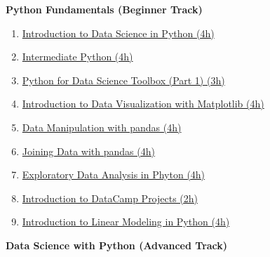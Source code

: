 \documentclass[
  11pt,
]{article}
\providecommand{\tightlist}{%
  \setlength{\itemsep}{0pt}\setlength{\parskip}{0pt}}
\newenvironment{tipsp}[1]
  {
  \begin{itemize}
  \footnotesize
  \renewcommand{\labelitemi}{
    \raisebox{-.7\height}[0pt][0pt]{
      {\setkeys{Gin}{width=3em,keepaspectratio}
        \texttt{[image: images/\#1.png]}}
    }
  }
  \setlength{\fboxsep}{1em}
  \begin{pbox}
  \item
  }
  {
  \end{pbox}
  \end{itemize}
  }
\begin{document}
\begin{tipsp}p

\textbf{Python Fundamentals (Beginner Track)}

\begin{enumerate}
\def\labelenumi{\arabic{enumi}.}
\tightlist
\item
  \href{https://www.datacamp.com/courses/introduction-to-data-science-in-python}{Introduction to Data Science in Python (4h)}
\item
  \href{https://www.datacamp.com/courses/intermediate-python-for-data-science}{Intermediate Python (4h)}
\item
  \href{https://www.datacamp.com/courses/python-data-science-toolbox-part-1}{Python for Data Science Toolbox (Part 1) (3h)}
\item
  \href{https://www.datacamp.com/courses/introduction-to-matplotlib}{Introduction to Data Visualization with Matplotlib (4h)}
\item
  \href{https://www.datacamp.com/courses/data-manipulation-with-pandas}{Data Manipulation with pandas (4h)}
\item
  \href{https://www.datacamp.com/courses/joining-data-with-pandas}{Joining Data with pandas (4h)}
\item
  \href{https://www.datacamp.com/courses/exploratory-data-analysis-in-python}{Exploratory Data Analysis in Phyton (4h)}
\item
  \href{https://www.datacamp.com/projects/33}{Introduction to DataCamp Projects (2h)}
\item
  \href{https://www.datacamp.com/courses/introduction-to-linear-modeling-in-python}{Introduction to Linear Modeling in Python (4h)}
\end{enumerate}

\textbf{Data Science with Python (Advanced Track)}


\end{tipsp}
\end{document}
